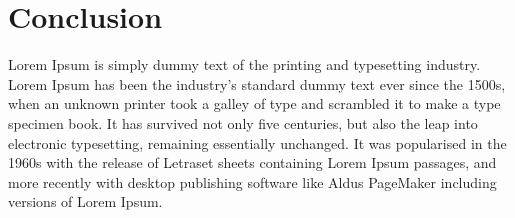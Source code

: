 \documentclass[11pt, notitlepage,abstracton,oneside]{article}   	%
\begin{document}
\section{Conclusion}
Lorem Ipsum is simply dummy text of the printing and typesetting industry. Lorem Ipsum has been the industry's standard dummy text ever since the 1500s, when an unknown printer took a galley of type and scrambled it to make a type specimen book. It has survived not only five centuries, but also the leap into electronic typesetting, remaining essentially unchanged. It was popularised in the 1960s with the release of Letraset sheets containing Lorem Ipsum passages, and more recently with desktop publishing software like Aldus PageMaker including versions of Lorem Ipsum.




\end{document}
